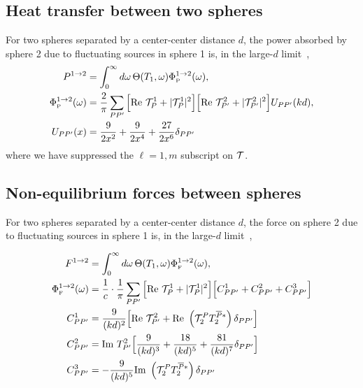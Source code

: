 \documentclass[letterpaper]{article}
\begin{document}
\subsection{Heat transfer between two spheres}

For two spheres separated by a center-center distance
$d$, the power absorbed by sphere 2 due to fluctuating
sources in sphere 1 is, in the large-$d$ limit~\cite{Kruger2012},
\begin{align*}
 P^{1\to 2} 
&= 
 \int_0^\infty d\omega \, \Theta(T_1,\omega) \Phi_{\hbox{\tiny{P}}}^{1\to 2}(\omega),
\\
 \Phi_{\hbox{\tiny{P}}}^{1\to 2}(\omega) 
&= 
 \frac{2}{\pi}\sum_{P P^\prime}
 \Big[ \text{Re }\mathcal{T}^1_{P} + |\mathcal{T}^1_{P}|^2\Big]
 \Big[ \text{Re }\mathcal{T}^2_{P^\prime} + |\mathcal{T}^2_{P^\prime}|^2\Big]
 U_{PP^\prime}(kd),
\\
 U_{PP^\prime}(x)
 &=\frac{9}{2x^2} + \frac{9}{2x^4} + \frac{27}{2x^6}\delta_{PP^\prime}
\end{align*}
where we have suppressed the $\ell=1, m$ subscript on
$\mathcal{T}$.

\subsection{Non-equilibrium forces between spheres}

For two spheres separated by a center-center distance
$d$, the force on sphere 2 due to fluctuating
sources in sphere 1 is, in the large-$d$ limit~\cite{Kruger2012},

\begin{align*}
 F^{1\to 2}
&=
 \int_0^\infty d\omega \, \Theta(T_1,\omega) \Phi_{\hbox{\tiny{F}}}^{1\to 2}(\omega),
\\
 \Phi_{\hbox{\tiny{F}}}^{1\to 2}(\omega)
&= \frac{1}{c}
   \cdot
   \frac{1}{\pi}\sum_{P P^\prime}
   \Big[ \text{Re }\mathcal{T}^1_P + |\mathcal{T}^1_P|^2\Big]
   \Big[ C^1_{PP^\prime} + C^2_{PP^\prime} + C^3_{PP^\prime} \Big]
\\
 C^1_{PP^\prime}
 &=\frac{9}{(kd)^2}
   \Big[ \text{Re }\mathcal{T}^2_{P^\prime} + 
         \text{Re }\left(\mathcal{T}_2^P T_2^{\overline{P}*}\right)\delta_{PP^\prime}
   \Big]
\\
 C^2_{PP^\prime}
 &=\text{Im }T^2_{P^\prime}
   \Big[ \frac{9}{(kd)^3} + \frac{18}{(kd)^5} + \frac{81}{(kd)^7}\delta_{PP^\prime}\Big]
\\
 C^3_{PP^\prime}
 &=-\frac{9}{(kd)^5}
    \text{Im }\left(\mathcal{T}_2^P T_2^{\overline{P}*}\right)\delta_{PP^\prime}
\end{align*}
\end{document}
